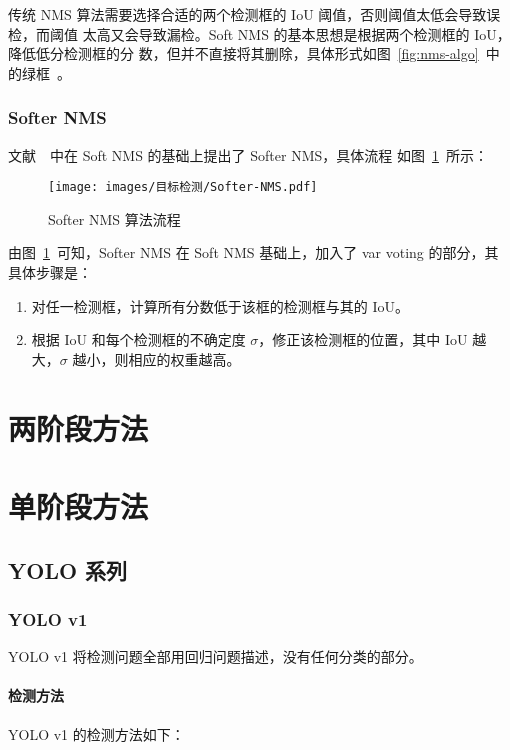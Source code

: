 传统 NMS 算法需要选择合适的两个检测框的 IoU 阈值，否则阈值太低会导致误检，而阈值
太高又会导致漏检。Soft NMS 的基本思想是根据两个检测框的 IoU，降低低分检测框的分
数，但并不直接将其删除，具体形式如图~\ref{fig:nms-algo}~中的绿框~。

\subsection{Softer NMS}
文献~~中在 Soft NMS 的基础上提出了 Softer NMS，具体流程
如图~\ref{fig:softer-nms}~所示：

\begin{figure}[ht]
  \centering
  \texttt{[image: images/目标检测/Softer-NMS.pdf]}
  \caption{Softer NMS 算法流程}
  \label{fig:softer-nms}
\end{figure}

由图~\ref{fig:softer-nms}~可知，Softer NMS 在 Soft NMS 基础上，加入了 var voting
的部分，其具体步骤是：

\begin{enumerate}
  \item 对任一检测框，计算所有分数低于该框的检测框与其的 IoU。
  \item 根据 IoU 和每个检测框的不确定度 $\sigma$，修正该检测框的位置，其中 IoU
    越大，$ \sigma $ 越小，则相应的权重越高。
\end{enumerate}

\chapter{两阶段方法}

\chapter{单阶段方法}

\section{YOLO 系列}
\label{sec:YOLO}

\subsection{YOLO v1}
\label{subsec:YOLOv1}
YOLO v1 将检测问题全部用回归问题描述，没有任何分类的部分。

\subsubsection{检测方法}
YOLO v1 的检测方法如下：

